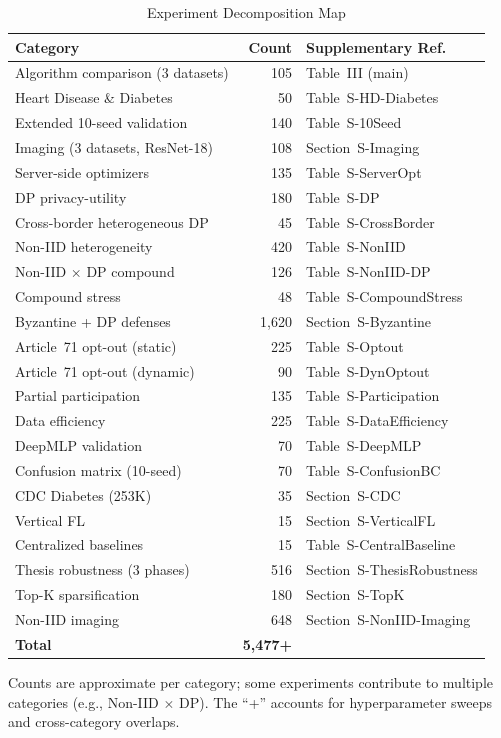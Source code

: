 \documentclass[conference]{IEEEtran}
\begin{document}
\begin{table}[htbp]
\centering
\caption{Experiment Decomposition Map}
\label{tab:experiment_map}
\small
\begin{tabular}{lrl}
\toprule
\textbf{Category} & \textbf{Count} & \textbf{Supplementary Ref.} \\
\midrule
Algorithm comparison (3 datasets) & 105 & Table~III (main) \\
Heart Disease \& Diabetes & 50 & Table~S-HD-Diabetes \\
Extended 10-seed validation & 140 & Table~S-10Seed \\
Imaging (3 datasets, ResNet-18) & 108 & Section~S-Imaging \\
Server-side optimizers & 135 & Table~S-ServerOpt \\
DP privacy-utility & 180 & Table~S-DP \\
Cross-border heterogeneous DP & 45 & Table~S-CrossBorder \\
Non-IID heterogeneity & 420 & Table~S-NonIID \\
Non-IID $\times$ DP compound & 126 & Table~S-NonIID-DP \\
Compound stress & 48 & Table~S-CompoundStress \\
Byzantine + DP defenses & 1,620 & Section~S-Byzantine \\
Article~71 opt-out (static) & 225 & Table~S-Optout \\
Article~71 opt-out (dynamic) & 90 & Table~S-DynOptout \\
Partial participation & 135 & Table~S-Participation \\
Data efficiency & 225 & Table~S-DataEfficiency \\
DeepMLP validation & 70 & Table~S-DeepMLP \\
Confusion matrix (10-seed) & 70 & Table~S-ConfusionBC \\
CDC Diabetes (253K) & 35 & Section~S-CDC \\
Vertical FL & 15 & Section~S-VerticalFL \\
Centralized baselines & 15 & Table~S-CentralBaseline \\
Thesis robustness (3 phases) & 516 & Section~S-ThesisRobustness \\
Top-K sparsification & 180 & Section~S-TopK \\
Non-IID imaging & 648 & Section~S-NonIID-Imaging \\
\midrule
\textbf{Total} & \textbf{5,477+} & \\
\bottomrule
\end{tabular}
\par{\footnotesize Counts are approximate per category; some experiments contribute to multiple categories (e.g., Non-IID $\times$ DP). The ``+'' accounts for hyperparameter sweeps and cross-category overlaps.}
\end{table}
\end{document}
